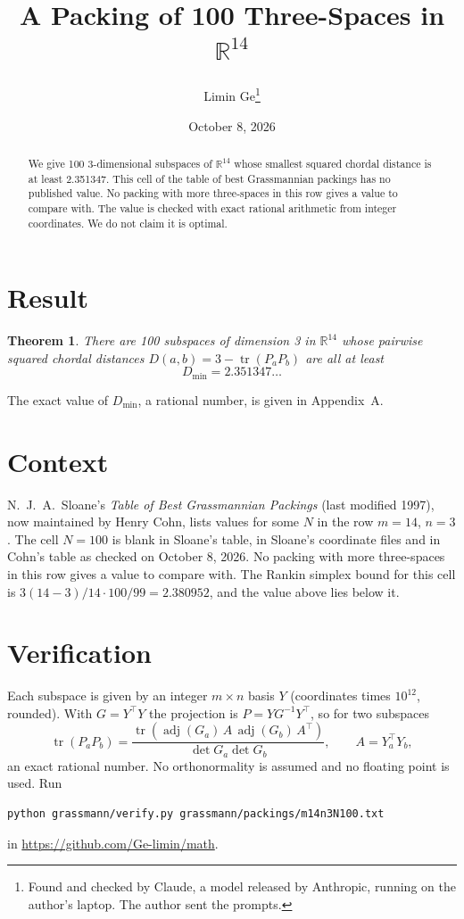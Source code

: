 \documentclass[11pt,a4paper]{article}
\title{A Packing of 100 Three-Spaces in $\mathbb{R}^{14}$}
\author{Limin Ge\thanks{Found and checked by Claude, a model released by Anthropic, running on the author's laptop. The author sent the prompts.}}
\date{October 8, 2026}
\newtheorem*{theorem}{Theorem}
\begin{document}
\maketitle
\begin{abstract}
We give 100 3-dimensional subspaces of $\mathbb{R}^{14}$ whose smallest squared chordal distance is at least 2.351347. This cell of the table of best Grassmannian packings has no published value. No packing with more three-spaces in this row gives a value to compare with. The value is checked with exact rational arithmetic from integer coordinates. We do not claim it is optimal.
\end{abstract}

\section{Result}
\begin{theorem}
There are 100 subspaces of dimension 3 in $\mathbb{R}^{14}$ whose pairwise squared chordal distances $D(a,b) = 3 - \operatorname{tr}(P_aP_b)$ are all at least
\[ D_{\min} = 2.351347\ldots \]
\end{theorem}
The exact value of $D_{\min}$, a rational number, is given in Appendix~A.


\section{Context}
N.~J.~A.~Sloane's \emph{Table of Best Grassmannian Packings} (last modified 1997), now maintained by Henry Cohn, lists values for some $N$ in the row $m=14$, $n=3$. The cell $N=100$ is blank in Sloane's table, in Sloane's coordinate files and in Cohn's table as checked on October 8, 2026. No packing with more three-spaces in this row gives a value to compare with. The Rankin simplex bound for this cell is $3(14-3)/14\cdot 100/99 = 2.380952$, and the value above lies below it.


\section{Verification}
Each subspace is given by an integer $m\times n$ basis $Y$ (coordinates times $10^{12}$, rounded). With $G=Y^\top Y$ the projection is $P=YG^{-1}Y^\top$, so for two subspaces
\[ \operatorname{tr}(P_aP_b)=\frac{\operatorname{tr}(\operatorname{adj}(G_a)\,A\,\operatorname{adj}(G_b)\,A^\top)}{\det G_a\det G_b},\qquad A=Y_a^\top Y_b, \]
an exact rational number. No orthonormality is assumed and no floating point is used. Run
\begin{verbatim}
python grassmann/verify.py grassmann/packings/m14n3N100.txt
\end{verbatim}
in \url{https://github.com/Ge-limin/math}.
\end{document}
